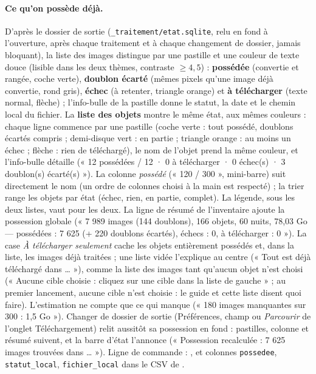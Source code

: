 \paragraph{Ce qu'on possède déjà.} D'après le dossier de sortie (\texttt{\_traitement/etat.sqlite}, relu en fond à
l'ouverture, après chaque traitement et à chaque changement de dossier, jamais bloquant), la liste des images
distingue par une pastille et une couleur de texte douce (lisible dans les deux thèmes, contraste $\geq 4{,}5$) :
\textbf{possédée} (convertie et rangée, coche verte), \textbf{doublon écarté} (mêmes pixels qu'une image déjà
convertie, rond gris), \textbf{échec} (à retenter, triangle orange) et \textbf{à télécharger} (texte normal,
flèche) ; l'info-bulle de la pastille donne le statut, la date et le chemin local du fichier. La \textbf{liste des
objets} montre le même état, aux mêmes couleurs : chaque ligne commence par une pastille (coche verte : tout possédé,
doublons écartés compris ; demi-disque vert : en partie ; triangle orange : au moins un échec ; flèche : rien de
téléchargé), le nom de l'objet prend la même couleur, et l'info-bulle détaille (« 12 possédées / 12 · 0 à télécharger
· 0 échec(s) · 3 doublon(s) écarté(s) »). La colonne \emph{possédé} (« 120 / 300 », mini-barre) suit directement le
nom (un ordre de colonnes choisi à la main est respecté) ; la trier range les objets par état (échec, rien, en
partie, complet). La légende, sous les deux listes, vaut pour les deux. La ligne de résumé de l'inventaire ajoute la
possession globale (« 7 989 images (144 doublons), 166 objets, 60 nuits, 78,03 Go — possédées : 7 625 (+ 220
doublons écartés), échecs : 0, à télécharger : 0 »). La case \emph{À télécharger seulement} cache les objets
entièrement possédés et, dans la liste, les images déjà traitées ; une liste vidée l'explique au centre (« Tout est
déjà téléchargé dans … »), comme la liste des images tant qu'aucun objet n'est choisi (« Aucune cible choisie : cliquez sur une cible dans
la liste de gauche » ; au premier lancement, aucune cible n'est choisie : le guide et cette liste disent quoi faire). L'estimation ne compte que ce qui manque
(« 180 images manquantes sur 300 : 1,5 Go »). Changer de dossier de sortie (Préférences, champ ou \emph{Parcourir}
de l'onglet Téléchargement) relit aussitôt sa possession en fond : pastilles, colonne et résumé suivent, et la barre
d'état l'annonce (« Possession recalculée : 7 625 images trouvées dans … »).
Ligne de commande : , et
colonnes \texttt{possedee}, \texttt{statut\_local}, \texttt{fichier\_local} dans le CSV de .

